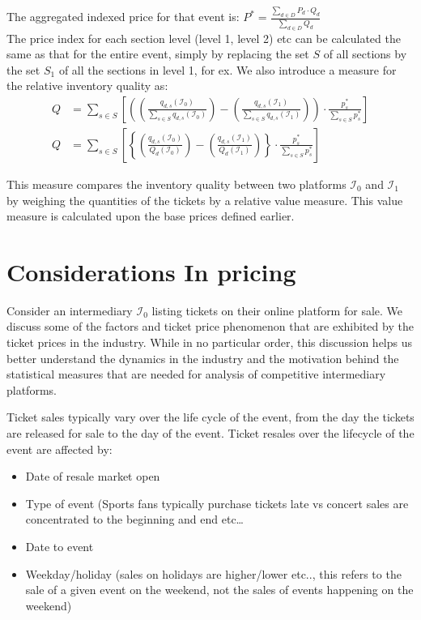 \documentclass[letterpaper, 12pt]{article}
\begin{document}
The aggregated indexed price for that event is: $P^* = \frac{\sum_{d\in D}P_d\cdot Q_d}{\sum_{d\in D}Q_d}$ \\

The price index for each section level (level 1, level 2) etc can be calculated the same as that for the entire event, simply by replacing the set $S$ of all sections by the set $S_1$ of all the sections in level 1, for ex. We also introduce a measure for the relative inventory quality as:
\begin{align*}
	Q & = \sum_{s\in S} \left[\left( \left( \frac{q_{d,s}(\mathcal{I}_0)}{\sum_{s\in S}q_{d,s}(\mathcal{I}_0)} \right) -  \left( \frac{q_{d,s}(\mathcal{I}_1)}{\sum_{s\in S}q_{d,s}(\mathcal{I}_1)} \right)\right)\cdot \frac{p^*_s}{\sum_{s\in S}p^*_s}\right]\\
	Q & = \sum_{s\in S} \left[\left\{ \left( \frac{q_{d,s}(\mathcal{I}_0)}{Q_d(\mathcal{I}_0)} \right) -  \left( \frac{q_{d,s}(\mathcal{I}_1)}{Q_d(\mathcal{I}_1)}\right) \right\}\cdot \frac{p^*_s}{\sum_{s\in S}p^*_s}\right]
\end{align*}

This measure compares the inventory quality between two platforms $\mathcal{I}_0$ and $\mathcal{I}_1$ by weighing the quantities of the tickets by a relative value measure. This value measure is calculated upon the base prices defined earlier.  




\section{Considerations In pricing}\label{cip}
Consider an intermediary $\mathcal{I}_0$ listing tickets on their online platform for sale. We discuss some of the factors and ticket price phenomenon that are exhibited by the ticket prices in the industry. While in no particular order, this discussion helps us better understand the dynamics in the industry and the motivation behind the statistical measures that are needed for analysis of competitive intermediary platforms.

 Ticket sales typically vary over the life cycle of the event, from the day the tickets are released for sale to the day of the event. Ticket resales over the lifecycle of the event are affected by:
\begin{itemize}\itemsep0em
	\item Date of resale market open
	\item Type of event (Sports fans typically purchase tickets late vs concert sales are concentrated to the beginning and end etc\dots
	\item Date to event 
	\item Weekday/holiday (sales on holidays are higher/lower etc.., this refers to the sale of a given event on the weekend, not the sales of events happening on the weekend)
\end{itemize}
\end{document}
